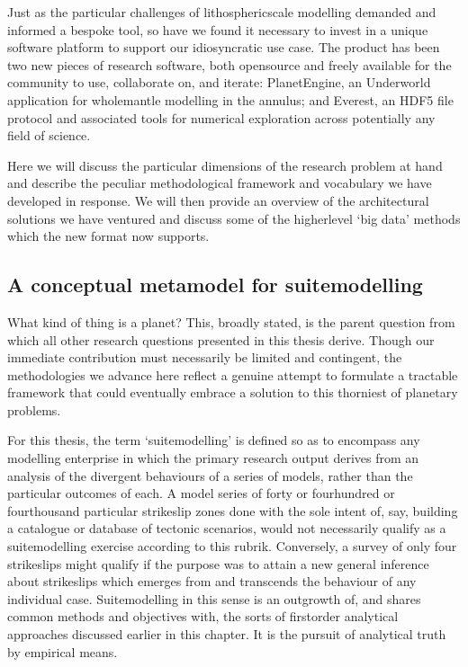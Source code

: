 \documentclass[letterpaper,10pt,english]{jupyterBook}
\begin{document}
\sphinxAtStartPar
Just as the particular challenges of lithospheric\sphinxhyphen{}scale modelling demanded and informed a bespoke tool, so have we found it necessary to invest in a unique software platform to support our idiosyncratic use case. The product has been two new pieces of research software, both open\sphinxhyphen{}source and freely available for the community to use, collaborate on, and iterate: PlanetEngine, an Underworld application for whole\sphinxhyphen{}mantle modelling in the annulus; and Everest, an HDF5 file protocol and associated tools for numerical exploration across potentially any field of science.

\sphinxAtStartPar
Here we will discuss the particular dimensions of the research problem at hand and describe the peculiar methodological framework and vocabulary we have developed in response. We will then provide an overview of the architectural solutions we have ventured and discuss some of the higher\sphinxhyphen{}level ‘big data’ methods which the new format now supports.


\subsection{A conceptual meta\sphinxhyphen{}model for suite\sphinxhyphen{}modelling}
\label{\detokenize{content/chapter_02_methods/section3:a-conceptual-meta-model-for-suite-modelling}}
\sphinxAtStartPar
What kind of thing is a planet? This, broadly stated, is the parent question from which all other research questions presented in this thesis derive. Though our immediate contribution must necessarily be limited and contingent, the methodologies we advance here reflect a genuine attempt to formulate a tractable framework that could eventually embrace a solution to this thorniest of planetary problems.

\sphinxAtStartPar
For this thesis, the term ‘suite\sphinxhyphen{}modelling’ is defined so as to encompass any modelling enterprise in which the primary research output derives from an analysis of the divergent behaviours of a series of models, rather than the particular outcomes of each. A model series of forty or four\sphinxhyphen{}hundred or four\sphinxhyphen{}thousand particular strike\sphinxhyphen{}slip zones done with the sole intent of, say, building a catalogue or database of tectonic scenarios, would not necessarily qualify as a suite\sphinxhyphen{}modelling exercise according to this rubrik. Conversely, a survey of only four strike\sphinxhyphen{}slips might qualify if the purpose was to attain a new general inference about strike\sphinxhyphen{}slips which emerges from and transcends the behaviour of any individual case. Suite\sphinxhyphen{}modelling in this sense is an outgrowth of, and shares common methods and objectives with, the sorts of first\sphinxhyphen{}order analytical approaches discussed earlier in this chapter. It is the pursuit of analytical truth by empirical means.
\end{document}
